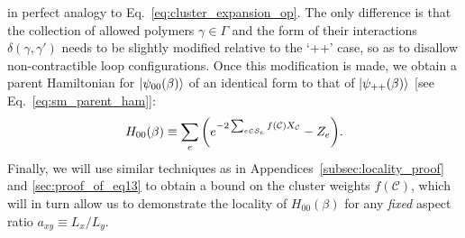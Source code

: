 in perfect analogy to Eq.~\eqref{eq:cluster_expansion_op}. The only difference is that the collection of allowed polymers $\gamma \in \Gamma$ and the form of their interactions $\delta(\gamma, \gamma')$ needs to be slightly modified relative to the `++' case, so as to disallow non-contractible loop configurations. Once this modification is made, we obtain a parent Hamiltonian for $\ket{\psi_{00}(\beta)}$ of an identical form to that of $\ket{\psi_{++}(\beta)}$ [see Eq.~\eqref{eq:sm_parent_ham}]:
\begin{equation}
\label{eq:H00_app}
    H_{00}(\beta) \equiv \sum_{e} \qty( e^{-2 \sum_{e \in \mathcal{S}_e} f(\mathcal{C}) X_{\mathcal{C}}} - Z_e ) .
\end{equation}
Finally, we will use similar techniques as in Appendices~\ref{subsec:locality_proof} and \ref{sec:proof_of_eq13} to obtain a bound on the cluster weights $f(\mathcal{C})$, which will in turn allow us to demonstrate the locality of $H_{00}(\beta)$ for any \emph{fixed} aspect ratio $a_{xy} \equiv L_x / L_y$.



